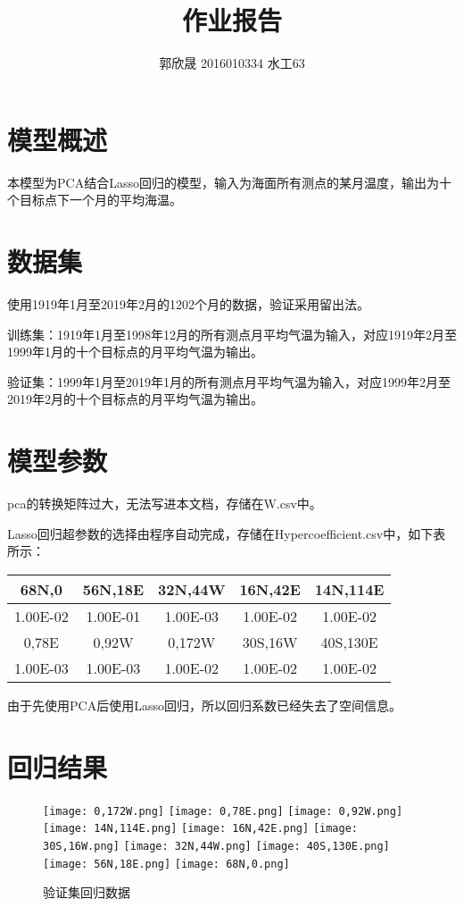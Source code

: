 \documentclass{article}
\title{作业报告}
\author{郭欣晟 2016010334 水工63}
\begin{document}
    \maketitle
    \section{模型概述}
    本模型为PCA结合Lasso回归的模型，输入为海面所有测点的某月温度，输出为十个目标点下一个月的平均海温。
    \section{数据集}
    使用1919年1月至2019年2月的1202个月的数据，验证采用留出法。

    训练集：1919年1月至1998年12月的所有测点月平均气温为输入，对应1919年2月至1999年1月的十个目标点的月平均气温为输出。

    验证集：1999年1月至2019年1月的所有测点月平均气温为输入，对应1999年2月至2019年2月的十个目标点的月平均气温为输出。
    \section{模型参数}
    pca的转换矩阵过大，无法写进本文档，存储在W.csv中。

    Lasso回归超参数的选择由程序自动完成，存储在Hypercoefficient.csv中，如下表所示：

    \begin{tabular}{|c|c|c|c|c|}
        \hline
        68N,0&56N,18E&32N,44W&16N,42E&14N,114E\\
        \hline
        1.00E-02 & 1.00E-01& 1.00E-03& 1.00E-02&1.00E-02\\
        \hline
        0,78E&0,92W&0,172W&30S,16W&40S,130E\\
        \hline
        1.00E-03&1.00E-03&1.00E-02&1.00E-02&1.00E-02\\
        \hline
    \end{tabular}

    由于先使用PCA后使用Lasso回归，所以回归系数已经失去了空间信息。

    \section{回归结果}

    \begin{figure}[H]
        \centering
        \caption{验证集回归数据}
        \texttt{[image: 0,172W.png]}
        \texttt{[image: 0,78E.png]}
        \texttt{[image: 0,92W.png]}
        \texttt{[image: 14N,114E.png]}
        \texttt{[image: 16N,42E.png]}
        \texttt{[image: 30S,16W.png]}
        \texttt{[image: 32N,44W.png]}
        \texttt{[image: 40S,130E.png]}
        \texttt{[image: 56N,18E.png]}
        \texttt{[image: 68N,0.png]}
    \end{figure}
\end{document}
